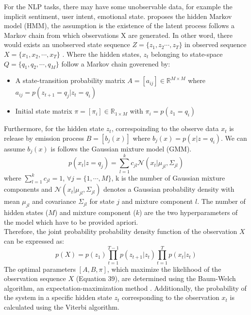 \documentclass[12pt,a4paper]{article}
\begin{document}
For the NLP tasks, there may have some unobservable data, for example the implicit sentiment, user intent, emotional state. \parencite{rabiner1993fundamentals} proposes the hidden Markov model (HMM), the assumption is the existence of the latent process follows a Markov chain from which observations X are generated. In other word, there would exists an unobserved state sequence $Z = \{z_1, z_2 \cdots , z_T\}$ in observed sequence $X = \{x_1, x_2, \cdots, x_T\}$ \parencite{sengupta2023hybrid}. Where the hidden states, $z_t$ belonging to state-space $Q = \{q_1, q_2, \cdots, q_M \}$ follow a Markov chain goverened by: 
\begin{itemize}
    \item A state-transition probability matrix $A = [a_{ij}] \in \mathbb{R}^{M \times M}$ where $a_{ij} = p(z_{t+1} = q_j | z_t = q_i)$ 
\end{itemize}
\begin{itemize}
    \item Initial state matrix $\pi = [\pi_i] \in \mathbb{R}_{1 \times M}$ with $\pi_i = p(z_1 = q_i)$
\end{itemize}
Furthermore, for the hidden state $z_t$, correspoinding to the observe data $x_t$ is release by emission process $B = [b_j(x)]$ where $b_j(x) = p(x|z=q_i)$. We can assume $b_j(x)$ is follows the Gaussian mixture model (GMM).
\begin{equation}
    p(x_t|z=q_j) = \sum_{l=1}^{k}c_{jl}\mathcal{N}(x_t|\mu_{jl}, \Sigma_{jl})
\end{equation}
where $\sum_{l=1}^{k}c_{jl} = 1$, $\forall j = \{1,\cdots, M\}$, k is the number of Gaussian mixture components and $\mathcal{N}(x_t|\mu_{jl}, \Sigma_{jl})$ denotes a Gaussian probability density with mean $\mu_{jl}$ and covariance $\Sigma_{jl}$ for state $j$ and mixture component $l$. The number of hidden states ($M$) and mixture component ($k$) are the two hyperparameters of the model which have to be provided apriori.
\\[1ex]
Therefore, the joint probability probability density function of the observation $X$ can be expressed as:
\begin{equation}
    p(X) = p(z_1) \prod_{t=1}^{T-1} p(z_{t+1}|z_{t}) \prod_{t=1}^{T} p(x_t|z_t)
\end{equation}
The optimal parameters $[A, B, \pi]$, which maximize the likelihood of the observation sequence $X$ (Equation 39), are determined using the Baum-Welch algorithm, an expectation-maximization method \parencite{rabiner1993fundamentals}. Additionally, the probability of the system in a specific hidden state $z_t$ corresponding to the observation $x_t$ is calculated using the Viterbi algorithm.
\end{document}
